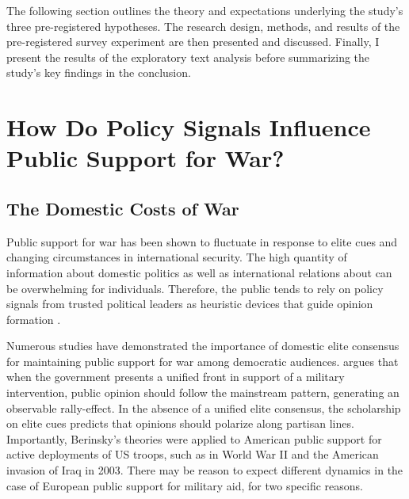 The following section outlines the theory and expectations underlying the study's three pre-registered hypotheses. The research design, methods, and results of the pre-registered survey experiment are then presented and discussed. Finally, I present the results of the exploratory text analysis before summarizing the study's key findings in the conclusion.

\section{How Do Policy Signals Influence Public Support for War?}
\subsection{The Domestic Costs of War}
Public support for war has been shown to fluctuate in response to elite cues and changing circumstances in international security. \autocite{chu_commanding_2021, alley_elite_2023, jentleson_still_1998, gelpi_performing_2010, gelpi_success_2005,  jakobbarrett_how_2026} The high quantity of information about domestic politics as well as international relations about can be overwhelming for individuals. Therefore, the public tends to rely on policy signals from trusted political leaders as heuristic devices that guide opinion formation \autocite{mondak_public_1993, zaller_nature_2006, berinsky_assuming_2007, baum_relationships_2008}. 

Numerous studies have demonstrated the importance of domestic elite consensus for maintaining public support for war among democratic audiences. \autocite{berinsky_assuming_2007, groeling_crossing_2008, baum_relationships_2008, baum_shot_2009} \textcite{berinsky_assuming_2007} argues that when the government presents a unified front in support of a military intervention, public opinion should follow the mainstream pattern, generating an observable rally-effect. In the absence of a unified elite consensus, the scholarship on elite cues predicts that opinions should polarize along partisan lines. \autocite{berinsky_assuming_2007, druckman_how_2013}  Importantly, Berinsky's theories were applied to American public support for active deployments of US troops, such as in World War II and the American invasion of Iraq in 2003. There may be reason to expect different dynamics in the case of European public support for military aid, for two specific reasons. 

